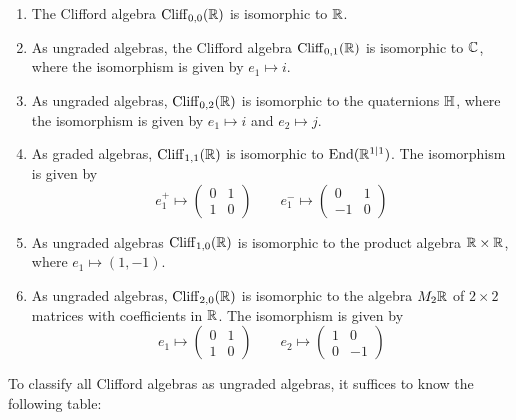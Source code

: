 \begin{exmp}\enumbreak
\begin{enumerate}
  \item The Clifford algebra $\operatorname{Cliff}_{0,0}(\mathbb{R})$ is isomorphic to $\mathbb{R}$.
  \item As ungraded algebras, the Clifford algebra $\operatorname{Cliff}_{0,1}(\mathbb{R})$ is isomorphic
  to $\mathbb{C}$, where the isomorphism is given by $e_1 \mapsto i$.
  \item As ungraded algebras, $\operatorname{Cliff}_{0,2}(\mathbb{R})$ is isomorphic to the quaternions
  $\mathbb{H}$, where the isomorphism is given by $e_1 \mapsto i$ and $e_2 \mapsto j$.
  \item As graded algebras, $\operatorname{Cliff}_{1,1}(\mathbb{R})$ is isomorphic to $\operatorname{End}(\mathbb{R}^{1|1})$.
  The isomorphism is given by
  \[
  e_1^+ \mapsto \begin{pmatrix}
  0 & 1 \\
  1 & 0
  \end{pmatrix} \qquad e_1^- \mapsto \begin{pmatrix}
  0 & 1 \\
  -1 & 0
  \end{pmatrix}
  \]
  \item As ungraded algebras $\operatorname{Cliff}_{1,0}(\mathbb{R})$ is isomorphic to the product
  algebra $\mathbb{R} \times \mathbb{R}$, where $e_1 \mapsto (1,-1)$.
  \item As ungraded algebras, $\operatorname{Cliff}_{2,0}(\mathbb{R})$ is isomorphic to the algebra $M_2\mathbb{R}$
  of $2 \times 2$ matrices with coefficients in $\mathbb{R}$. The isomorphism is given by
  \[
  e_1 \mapsto \begin{pmatrix}
  0 & 1 \\
  1 & 0
  \end{pmatrix} \qquad e_2 \mapsto \begin{pmatrix}
  1 & 0 \\
  0 & -1
  \end{pmatrix}
  \]
\end{enumerate}
\end{exmp}
%
To classify all Clifford algebras as ungraded algebras, it suffices to know
the following table: \\\\
